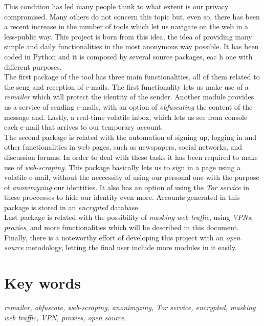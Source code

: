 This condition has led many people think to what extent is our privacy compromised. Many others do not concern this topic but, even so, there has been a recent increase in the number of tools which let us navigate on the web in a less-public way. This project is born from this idea, the idea of providing many simple and daily functionalities in the most anonymous way possible. It has been coded in Python and it is composed by several source packages, eac h one with different purposes.\\
The first package of the tool has three main functionalities, all of them related to the seng and reception of e-mails. The first functionality lets us make use of a \textit{remailer} which will protect the identity of the sender. Another module provides us a service of sending e-mails, with an option of \textit{obfuscating} the content of the message and. Lastly, a real-time volatile inbox, which lets us see from console each e-mail that arrives to our temporary account.\\
The second package is related with the automation of signing up, logging in and other functionalities in web pages, such as newspapers, social networks, and discussion forums. In order to deal with these tasks it has been required to make use of \textit{web-scraping}. This package basically lets us to sign in a page using a volatile e-mail, without the neccessity of using our personal one with the purpose of \textit{anonimyzing} our identities. It also has an option of using the \textit{Tor service} in these proccesses to hide our identity even more. Accounts generated in this package is stored in an \textit{encrypted} database. \\
Last package is related with the possibility of \textit{masking web traffic}, using \textit{VPNs}, \textit{proxies}, and more functionalities which will be described in this document.\\
Finally, there is a noteworthy effort of developing this project with an \textit{open source} metodology, letting the final user include more modules in it easily.\\

\section*{Key words}
\textit{remailer, obfuscate, web-scraping, anonimyzing, Tor service, encrypted, masking web traffic, VPN, proxies, open source}.
